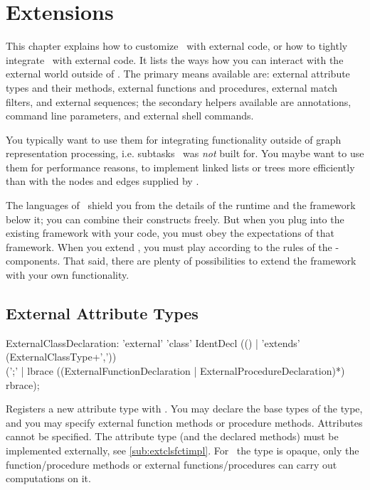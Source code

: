 \chapter{Extensions}\label{chapextensions}

This chapter explains how to customize \GrG\ with external code, or how to tightly integrate \GrG\ with external code.
It lists the ways how you can interact with the external world outside of \GrG.
The primary means available are: external attribute types and their methods, external functions and procedures, external match filters, and external sequences; the secondary helpers available are annotations, command line parameters, and external shell commands.

You typically want to use them for integrating functionality outside of graph representation processing, i.e. subtasks \GrG\ was \emph{not} built for.
You maybe want to use them for performance reasons, to implement linked lists or trees more efficiently than with the nodes and edges supplied by \GrG.

The languages of \GrG\ shield you from the details of the runtime and the framework below it; you can combine their constructs freely.
But when you plug into the existing framework with your code, you must obey the expectations of that framework.
When you extend \GrG, you must play according to the rules of the \GrG-components.
That said, there are plenty of possibilities to extend the framework with your own functionality.

\section{External Attribute Types}\label{sub:extcls}
\begin{rail}
  ExternalClassDeclaration: 'external' 'class' IdentDecl (() | 'extends' (ExternalClassType+',')) \\
	(';' | lbrace ((ExternalFunctionDeclaration | ExternalProcedureDeclaration)*) rbrace);
\end{rail}
Registers a new attribute type with \GrG. 
You may declare the base types of the type, and you may specify external function methods or procedure methods.
Attributes cannot be specified. 
The attribute type (and the declared methods) must be implemented externally, see \ref{sub:extclsfctimpl}.
For \GrG~the type is opaque, only the function/procedure methods or external functions/procedures can carry out computations on it. 

